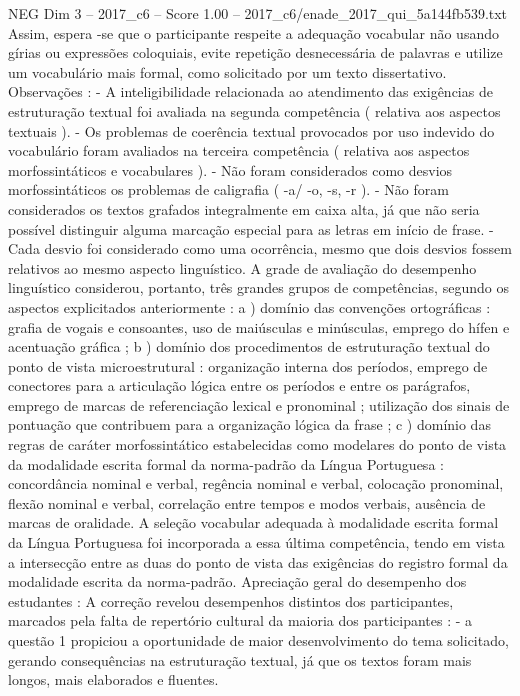 \begin{textsample}{NEG Dim 3 – 2017\_c6 – Score 1.00 – 2017\_c6/enade\_2017\_qui\_5a144fb539.txt}
Assim, espera -se que o participante respeite a adequação vocabular não usando gírias ou expressões coloquiais, evite repetição desnecessária de palavras e utilize um vocabulário mais formal, como solicitado por um texto dissertativo.
Observações : - A inteligibilidade relacionada ao atendimento das exigências de estruturação textual foi avaliada na segunda competência ( relativa aos aspectos textuais ). - Os problemas de coerência textual provocados por uso indevido do vocabulário foram avaliados na terceira competência ( relativa aos aspectos morfossintáticos e vocabulares ). - Não foram considerados como desvios morfossintáticos os problemas de caligrafia ( -a/ -o, -s, -r ). - Não foram considerados os textos grafados integralmente em caixa alta, já que não seria possível distinguir alguma marcação especial para as letras em início de frase. - Cada desvio foi considerado como uma ocorrência, mesmo que dois desvios fossem relativos ao mesmo aspecto linguístico.
A grade de avaliação do desempenho linguístico considerou, portanto, três grandes grupos de competências, segundo os aspectos explicitados anteriormente : a ) domínio das convenções ortográficas : grafia de vogais e consoantes, uso de maiúsculas e minúsculas, emprego do hífen e acentuação gráfica ; b ) domínio dos procedimentos de estruturação textual do ponto de vista microestrutural : organização interna dos períodos, emprego de conectores para a articulação lógica entre os períodos e entre os parágrafos, emprego de marcas de referenciação lexical e pronominal ; utilização dos sinais de pontuação que contribuem para a organização lógica da frase ; c ) domínio das regras de caráter morfossintático estabelecidas como modelares do ponto de vista da modalidade escrita formal da norma-padrão da Língua Portuguesa : concordância nominal e verbal, regência nominal e verbal, colocação pronominal, flexão nominal e verbal, correlação entre tempos e modos verbais, ausência de marcas de oralidade.
A seleção vocabular adequada à modalidade escrita formal da Língua Portuguesa foi incorporada a essa última competência, tendo em vista a intersecção entre as duas do ponto de vista das exigências do registro formal da modalidade escrita da norma-padrão.
Apreciação geral do desempenho dos estudantes : A correção revelou desempenhos distintos dos participantes, marcados pela falta de repertório cultural da maioria dos participantes : - a questão 1 propiciou a oportunidade de maior desenvolvimento do tema solicitado, gerando consequências na estruturação textual, já que os textos foram mais longos, mais elaborados e fluentes.

\end{textsample}
